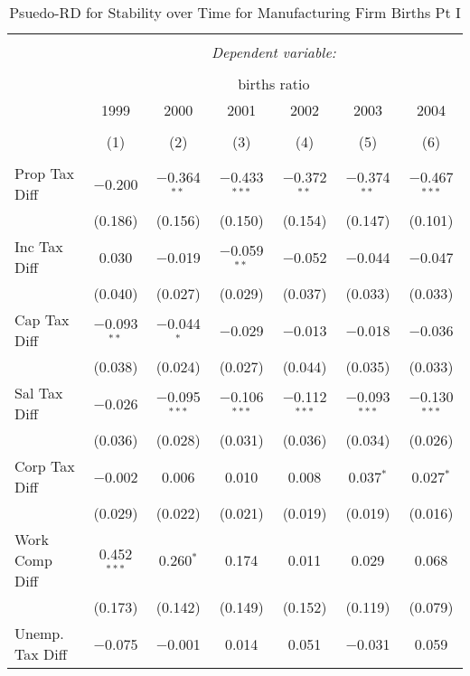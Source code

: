 
\begin{table}[!htbp] \centering 
  \caption{Psuedo-RD for Stability over Time for  Manufacturing Firm Births Pt I} 
  \label{31-33year} 
\small 
\begin{tabular}{@{\extracolsep{5pt}}lcccccc} 
\\[-1.8ex]\hline 
\hline \\[-1.8ex] 
 & \multicolumn{6}{c}{\textit{Dependent variable:}} \\ 
\cline{2-7} 
\\[-1.8ex] & \multicolumn{6}{c}{births ratio} \\ 
 & 1999 & 2000 & 2001 & 2002 & 2003 & 2004 \\ 
\\[-1.8ex] & (1) & (2) & (3) & (4) & (5) & (6)\\ 
\hline \\[-1.8ex] 
 Prop Tax Diff & $-$0.200 & $-$0.364$^{**}$ & $-$0.433$^{***}$ & $-$0.372$^{**}$ & $-$0.374$^{**}$ & $-$0.467$^{***}$ \\ 
  & (0.186) & (0.156) & (0.150) & (0.154) & (0.147) & (0.101) \\ 
  Inc Tax Diff & 0.030 & $-$0.019 & $-$0.059$^{**}$ & $-$0.052 & $-$0.044 & $-$0.047 \\ 
  & (0.040) & (0.027) & (0.029) & (0.037) & (0.033) & (0.033) \\ 
  Cap Tax Diff & $-$0.093$^{**}$ & $-$0.044$^{*}$ & $-$0.029 & $-$0.013 & $-$0.018 & $-$0.036 \\ 
  & (0.038) & (0.024) & (0.027) & (0.044) & (0.035) & (0.033) \\ 
  Sal Tax Diff & $-$0.026 & $-$0.095$^{***}$ & $-$0.106$^{***}$ & $-$0.112$^{***}$ & $-$0.093$^{***}$ & $-$0.130$^{***}$ \\ 
  & (0.036) & (0.028) & (0.031) & (0.036) & (0.034) & (0.026) \\ 
  Corp Tax Diff & $-$0.002 & 0.006 & 0.010 & 0.008 & 0.037$^{*}$ & 0.027$^{*}$ \\ 
  & (0.029) & (0.022) & (0.021) & (0.019) & (0.019) & (0.016) \\ 
  Work Comp Diff & 0.452$^{***}$ & 0.260$^{*}$ & 0.174 & 0.011 & 0.029 & 0.068 \\ 
  & (0.173) & (0.142) & (0.149) & (0.152) & (0.119) & (0.079) \\ 
  Unemp. Tax Diff & $-$0.075 & $-$0.001 & 0.014 & 0.051 & $-$0.031 & 0.059 \\ 

\end{tabular}
\end{table}
